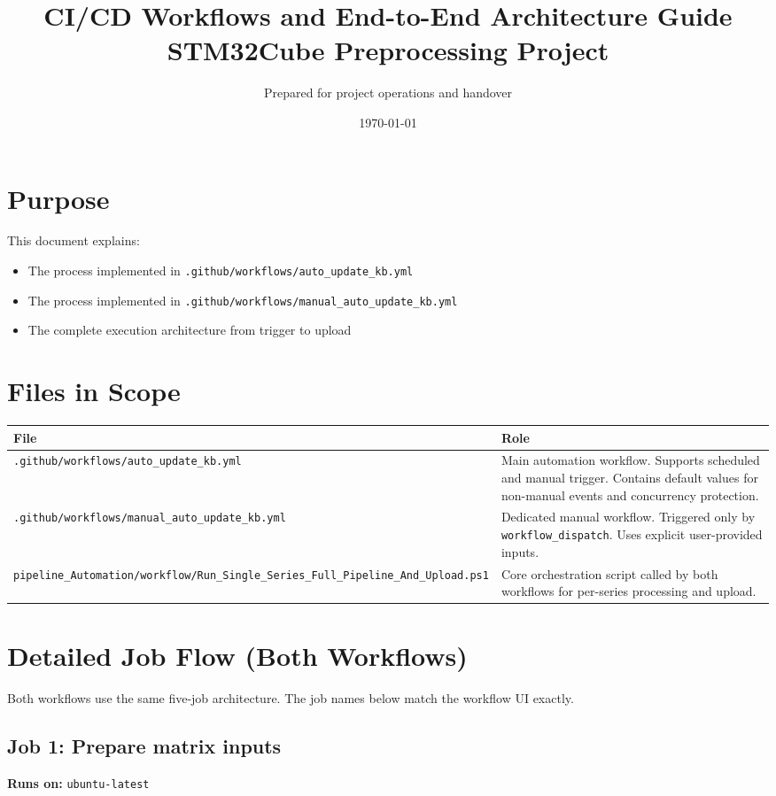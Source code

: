 \documentclass[11pt,a4paper]{article}
\title{CI/CD Workflows and End-to-End Architecture Guide\\STM32Cube Preprocessing Project}
\author{Prepared for project operations and handover}
\date{\today}
\begin{document}
\maketitle
\tableofcontents
\newpage

\section{Purpose}
This document explains:
\begin{itemize}
  \item The process implemented in \texttt{.github/workflows/auto\_update\_kb.yml}
  \item The process implemented in \texttt{.github/workflows/manual\_auto\_update\_kb.yml}
  \item The complete execution architecture from trigger to upload
\end{itemize}

\section{Files in Scope}
\begin{longtable}{|p{}|p{}|}
\hline
\textbf{File} & \textbf{Role} \\
\hline
\texttt{.github/workflows/auto\_update\_kb.yml} & Main automation workflow. Supports scheduled and manual trigger. Contains default values for non-manual events and concurrency protection. \\
\hline
\texttt{.github/workflows/manual\_auto\_update\_kb.yml} & Dedicated manual workflow. Triggered only by \texttt{workflow\_dispatch}. Uses explicit user-provided inputs. \\
\hline
\texttt{pipeline\_Automation/workflow/Run\_Single\_Series\_Full\_Pipeline\_And\_Upload.ps1} & Core orchestration script called by both workflows for per-series processing and upload. \\
\hline
\end{longtable}

\section{Detailed Job Flow (Both Workflows)}
Both workflows use the same five-job architecture. The job names below match the workflow UI exactly.

\subsection{Job 1: Prepare matrix inputs}
\textbf{Runs on:} \texttt{ubuntu-latest}
\end{document}

